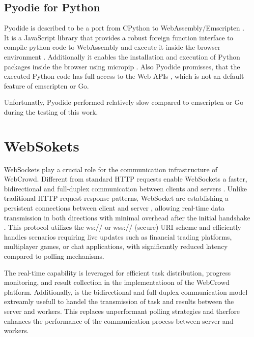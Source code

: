 \subsection{Pyodie for Python}
\label{subsec:methodology:wasm:python}
Pyodide is described to be a port from CPython to WebAssembly/Emscripten \cite{methodology:pyodie}. It is a JavaScript library that provides a robust foreign function interface to compile python code to WebAssembly and execute it inside the browser environment \cite{methodology:pyodie}. Additionally it enables the installation and execution of Python packages inside the browser using micropip \cite{methodology:pyodie}. Also Pyodide promisses, that the executed Python code has full access to the Web \ac{API}s \cite{methodology:pyodie}, which is not an default feature of emscripten or Go.

Unfortunatly, Pyodide performed relatively slow compared to emscripten or Go during the testing of this work.

\section{WebSokets}
\label{sec:methodology:websokets}
WebSockets play a crucial role for the communication infrastructure of WebCrowd. Different from standard \ac{HTTP} requests enable WebSockets a faster, bidirectional and full-duplex communication between clients and servers \cite{methodology:websockets1, methodology:websockets3, methodology:websockets2}. Unlike traditional \ac{HTTP} request-response patterns, WebSocket are establishing a persistent connections between client and server \cite{methodology:websockets3}, allowing real-time data transmission in both directions with minimal overhead after the initial handshake \cite{methodology:websockets3}. This protocol utilizes the ws:// or wss:// (secure) URI scheme and efficiently handles scenarios requiring live updates such as financial trading platforms, multiplayer games, or chat applications, with significantly reduced latency compared to polling mechanisms.

The real-time capability is leveraged for efficient task distribution, progress monitoring, and result collection in the implementatioon of the WebCrowd platform. Additionally, is the bidirectional and full-duplex communication model extreamly usefull to handel the transmission of task and results between the server and workers. This replaces unperformant polling strategies and therfore enhances the performance of the communication process between server and workers.

